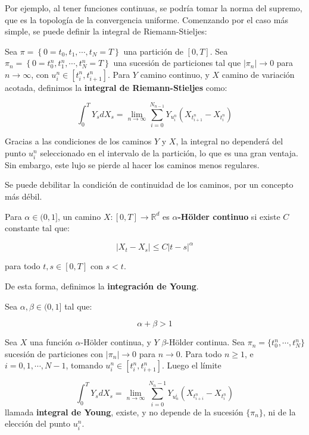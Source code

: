 Por ejemplo, al tener funciones continuas, se podría tomar la norma del supremo, que es la topología de la convergencia uniforme. Comenzando por el caso más simple, se puede definir la integral de Riemann-Stieljes:

\begin{boxDef}
	Sea $\pi = \left\{ 0 = t_0, t_1, \cdots, t_N  = T\right\}$ una partición de $[0,T]$. Sea $\pi_n  = \left\{ 0 = t_0^n, t_1^n, \cdots, t_N^n  = T\right\} $ una sucesión de particiones tal que $\lvert \pi_n \rvert \rightarrow 0$ para $n \rightarrow \infty$, con $u_i^n \in [t_i^n, t_{i+1}^n]$. Para $Y$ camino continuo, y $X$ camino de variación acotada, definimos la \textbf{integral de Riemann-Stieljes} como:

	\[
		\int_0^T Y_s dX_s = \lim_{n \rightarrow \infty} \sum_{i = 0}^{N_{n-1} } Y_{u_i^n} (X_{t_{i+1}^n} -  X_{t_i^n})
	\]

\end{boxDef}

Gracias a las condiciones de los caminos $Y$ y $X$, la integral no dependerá del punto $u_i^n$ seleccionado en el intervalo de la partición, lo que es una gran ventaja. Sin embargo, este lujo se pierde al hacer los caminos menos regulares.

Se puede debilitar la condición de continuidad de los caminos, por un concepto más débil.

\begin{boxDef}
	Para $\alpha \in (0, 1]$, un camino $X: [0, T] \rightarrow \mathbb{R}^d$ es $\alpha$\textbf{-Hölder continuo} si existe $C$ constante tal que:

	\[
		\lvert X_t - X_s \rvert \leq C \lvert t - s \rvert^{\alpha}
	\]

	para todo $t, s \in [0, T]$ con $s < t$.
\end{boxDef}

De esta forma, definimos la \textbf{integración de Young}.

\begin{theorem}
\label{thm:Young}
	Sea $\alpha, \beta \in (0, 1]$ tal que:

	\[
		\alpha + \beta > 1
	\]

	Sea $X$ una función $\alpha$-Hölder continua, y $Y$ $\beta$-Hölder continua. Sea $\pi_n = \{ t_0^n, \cdots, t_N^n  \}$ sucesión de particiones con $\lvert \pi_n \rvert \rightarrow 0$ para $n \rightarrow 0$. Para todo $n \geq 1$, e $i = 0, 1, \cdots, N - 1$, tomando $u_i^n \in [t_i^n, t_{i+1}^n]$. Luego el límite

	\[
		\int_0^T Y_s dX_s = \lim_{n \rightarrow \infty} \sum_{i = 0}^{N_n - 1} Y_{u_n^i} (X_{t_{i+i}^n} - X_{t_i^n} )
	\] 
	llamada \textbf{integral de Young}, existe, y no depende de la sucesión $\{ \pi_n \}$, ni de la elección del punto $u_i^n$.

\end{theorem}

